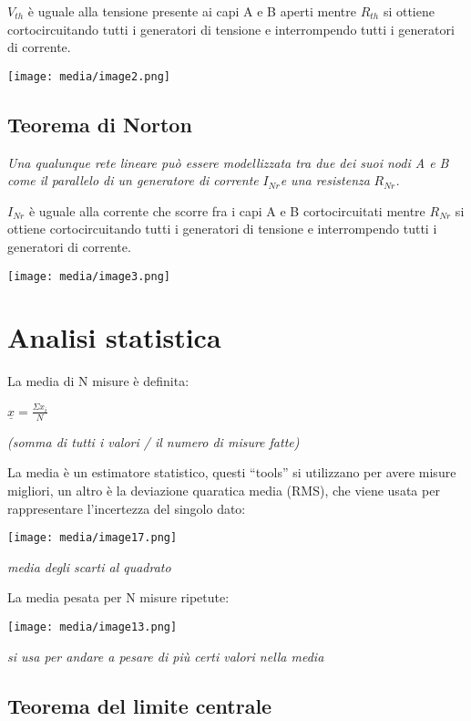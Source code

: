 \(V_{th}\) è uguale alla tensione presente ai capi A e B aperti mentre
\(R_{th}\) si ottiene cortocircuitando tutti i generatori di tensione e
interrompendo tutti i generatori di corrente.

\texttt{[image: media/image2.png]}

\subsection{Teorema di Norton}\label{teorema-di-norton}

\emph{Una qualunque rete lineare può essere modellizzata tra due dei
suoi nodi A e B come il parallelo di un generatore di corrente}
\(I_{Nr}\)\emph{e una resistenza} \(R_{Nr}\)\emph{.}

\(I_{Nr}\) è uguale alla corrente che scorre fra i capi A e B
cortocircuitati mentre \(R_{Nr}\) si ottiene cortocircuitando tutti i
generatori di tensione e interrompendo tutti i generatori di corrente.

\texttt{[image: media/image3.png]}

\section{Analisi statistica}\label{analisi-statistica}

La media di N misure è definita:

\(\underline{x} = \frac{\Sigma x_{i}}{N}\)

\emph{(somma di tutti i valori / il numero di misure fatte)}

La media è un estimatore statistico, questi ``tools'' si utilizzano per
avere misure migliori, un altro è la deviazione quaratica media (RMS),
che viene usata per rappresentare l'incertezza del singolo dato:

\texttt{[image: media/image17.png]}

\emph{media degli scarti al quadrato}

La media pesata per N misure ripetute:

\texttt{[image: media/image13.png]}

\emph{si usa per andare a pesare di più certi valori nella media}

\subsection{Teorema del limite
centrale}\label{teorema-del-limite-centrale}

